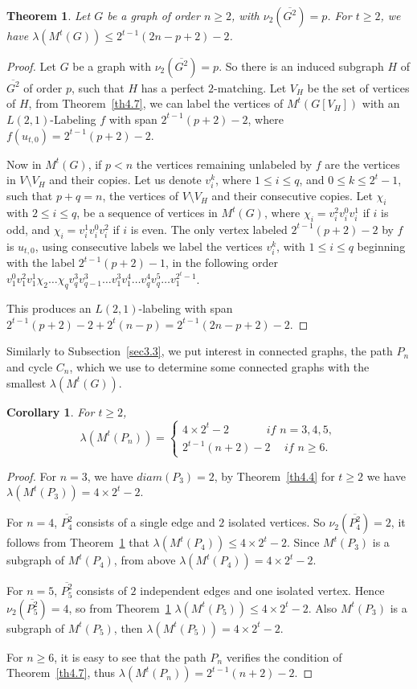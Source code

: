 \documentclass{article}
\newtheorem{theorem} {Theorem}
\newtheorem{cor} {Corollary}
\newtheorem{open problem} {Open Problem}
\numberwithin{lemma}{section}
\numberwithin{theorem}{section}
\numberwithin{cor}{section}
\numberwithin{prop}{section}
\numberwithin{con}{section}
\numberwithin{claim}{section}
\numberwithin{obs}{section}
\numberwithin{dnt}{section}
\begin{document}
\begin{theorem}\label{th4.8}
	Let $G$ be a graph of order $n\geq 2$, with $\nu_2(\overline{G^2})=p$. For $t\geq 2$, we have $\lambda(M^t(G))\leq  2^{t-1}(2n-p+2)-2$.
\end{theorem}
\begin{proof}
	Let $G$ be a graph with $\nu_2(\overline{G^2})=p$. So there is an induced subgraph $H$ of $\overline{G^2}$ of order $p$, such that $H$ has a perfect $2$-matching. Let $V_H$ be the set of vertices of $H$, from Theorem~\ref{th4.7}, we can label the vertices of $M^t(G[V_H])$ with an $L(2,1)$-Labeling $f$ with span $2^{t-1}(p+2)-2$, where $f(u_{t,0})=2^{t-1}(p+2)-2$.\par 
	Now in $M^t(G)$, if $p<n$ the vertices remaining unlabeled by $f$ are the vertices in $V\setminus V_H$  and their copies. Let us denote $v^k_i$, where $1\leq i\leq q$, and $0\leq k\leq 2^t-1$, such that $p+q=n$, the vertices of $V\setminus V_H$ and their consecutive copies. Let $\chi_i$ with $2\leq i\leq q$, be a sequence of vertices in $M^t(G)$, where $\chi_i=v^2_iv^0_iv^1_i$ if $i$ is odd, and $\chi_i=v^1_iv^0_iv^2_i$ if $i$ is even. The only vertex labeled $2^{t-1}(p+2)-2$ by $f$ is $u_{t,0}$, using consecutive labels we label the vertices $v^k_i$, with $1\leq i\leq q$  beginning with the label $2^{t-1}(p+2)-1$, in the following order  $v^0_1v^2_1v^1_1\chi_2\ldots \chi_qv^3_qv^3_{q-1}\ldots v^3_1v^4_1\ldots v^4_qv^5_q\ldots v^{2^t-1}_1$.\par
	This produces an $L(2,1)$-labeling with span $2^{t-1}(p+2)-2+2^t(n-p)=2^{t-1}(2n-p+2)-2$.
\end{proof}
Similarly to Subsection~\ref{sec3.3}, we put interest in connected graphs, the path $P_n$ and cycle $C_n$, which we use to determine some connected graphs with the smallest $\lambda(M^t(G))$. 
\begin{cor}\label{cor4.3}
	For $t\geq 2$,	$$\lambda(M^t(P_n))=\begin{cases}
	4\times 2^t-2 \hspace{40pt}if\,\, n=3,4,5, \\
	2^{t-1}(n+2)-2 \hspace{15pt}if\,\,n \geq 6.	
	\end{cases}	$$
\end{cor} 
\begin{proof}	
	For $n=3$,  we have $diam(P_3)=2$, by Theorem~\ref{th4.4} for $t\geq 2$ we have $ \lambda(M^t(P_3))= 4\times 2^t-2$.\par	
	For $n=4$, $\overline{P^2_4}$ consists of a single edge and $2$ isolated vertices. So $\nu_2(\overline{P^2_4})=2$, it follows from Theorem~\ref{th4.8} that $\lambda(M^t(P_4))\leq 4\times 2^t-2$. Since $M^t(P_3)$ is a subgraph of $M^t(P_4)$, from above $\lambda(M^t(P_4))=4\times 2^t-2$.\par
	For $n=5$, $\overline{P^2_5}$ consists of $2$ independent edges and one isolated vertex. Hence $\nu_2(\overline{P^2_5})=4$, so from Theorem~\ref{th4.8} $\lambda(M^t(P_5))\leq 4\times 2^t-2$. Also $M^t(P_3)$ is a subgraph of $M^t(P_5)$, then $\lambda(M^t(P_5))=4\times 2^t-2$.\par
	For $n\geq 6$, it is easy to see that the path $P_n$ verifies the condition of Theorem~\ref{th4.7}, thus  $\lambda(M^t(P_n))=2^{t-1}(n+2)-2$.
\end{proof}
\end{document}
